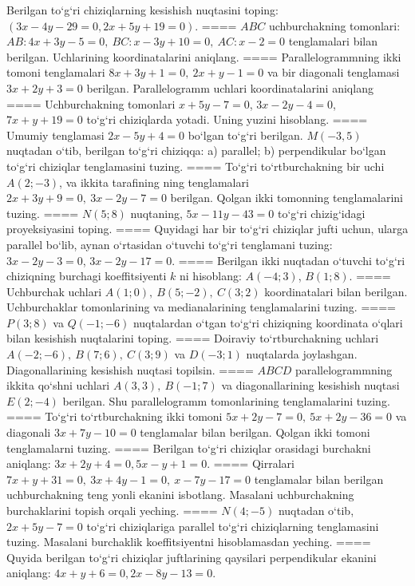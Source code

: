 Berilgan to‘g‘ri chiziqlarning kesishish nuqtasini toping:
$(3x-4y-29=0, 2x+5y+19=0)$.
====
$ABC$ uchburchakning tomonlari:
\(AB:4x+3y-5=0,\ BC:x-3y+10=0,\ AC:x-2=0\) 
tenglamalari bilan berilgan. Uchlarining koordinatalarini aniqlang.
====
Parallelogrammning ikki tomoni tenglamalari
\(8x+3y+1=0,\ 2x+y-1=0\) va bir diagonali tenglamasi
\(3x+2y+3=0\) berilgan. Parallelogramm uchlari koordinatalarini
aniqlang
====
Uchburchakning tomonlari \(x+5y-7=0\),
\(3x-2y-4=0\), \(7x+y+19=0\) to‘g‘ri chiziqlarda yotadi. Uning
yuzini hisoblang.
====
Umumiy tenglamasi \(2x-5y+4=0\) bo‘lgan to‘g‘ri
berilgan. \(M (-3,5) \) nuqtadan o‘tib, berilgan to‘g‘ri chiziqqa: a) parallel;
b) perpendikular bo‘lgan to‘g‘ri chiziqlar tenglamasini tuzing.
====
To‘g‘ri to‘rtburchakning bir uchi \(A (2;-3) \), va ikkita tarafining
ning tenglamalari \(2x+3y+9=0,\ 3x-2y-7=0\)
berilgan. Qolgan ikki tomonning tenglamalarini tuzing.
====
\(N (5;8) \) nuqtaning, \(5x-11y-43=0\) to‘g‘ri chizig‘idagi
proyeksiyasini toping.
====
Quyidagi har bir to‘g‘ri chiziqlar jufti uchun, ularga parallel
bo‘lib, aynan o‘rtasidan o‘tuvchi to‘g‘ri tenglamani tuzing: $3x-2y-3=0$, $3x-2y-17=0$.
====
Berilgan ikki nuqtadan o‘tuvchi to‘g‘ri chiziqning burchagi
koeffitsiyenti $k$ ni hisoblang: $A (-4;3) $, $B (1;8) $.
====
Uchburchak uchlari \(A (1;0),\ B (5;-2),\ C (3;2) \)
koordinatalari bilan berilgan. Uchburchaklar tomonlarining va
medianalarining tenglamalarini tuzing.
====
\(P (3;8) \) va \(Q (-1;-6) \) nuqtalardan o‘tgan
to‘g‘ri chiziqning koordinata o‘qlari bilan kesishish nuqtalarini toping.
====
Doiraviy to‘rtburchakning uchlari
\(A (-2;-6),\ B (7;6),\ C (3;9) \) va \(D (-3;1) \) nuqtalarda
joylashgan. Diagonallarining kesishish nuqtasi topilsin.
====
$ABCD$ parallelogrammning ikkita qo‘shni uchlari
\(A (3,3),\ B (-1;7) \) va diagonallarining kesishish nuqtasi
\(E (2;-4) \) berilgan. Shu parallelogramm tomonlarining tenglamalarini
tuzing.
====
To‘g‘ri to‘rtburchakning ikki tomoni
\(5x+2y-7=0,\ 5x+2y-36=0\) va diagonali
\(3x+7y-10=0\) tenglamalar bilan berilgan. Qolgan ikki tomoni
tenglamalarni tuzing.
====
Berilgan to‘g‘ri chiziqlar orasidagi burchakni aniqlang: $3x+2y+4=0, 5x-y+1=0$.
====
Qirralari
\(7x+y+31=0,\ 3x+4y-1=0,\ x-7y-17=0\) tenglamalar
bilan berilgan uchburchakning teng yonli ekanini isbotlang.
Masalani uchburchakning
burchaklarini topish orqali yeching.
====
\(N (4;-5) \) nuqtadan o‘tib, $2x+5y-7=0$
to‘g‘ri chiziqlariga parallel to‘g‘ri chiziqlarning tenglamasini tuzing. Masalani burchaklik
koeffitsiyentni hisoblamasdan yeching.
====
Quyida berilgan to‘g‘ri chiziqlar juftlarining qaysilari
perpendikular ekanini aniqlang: $4x+y+6=0, 2x-8y-13=0$.
